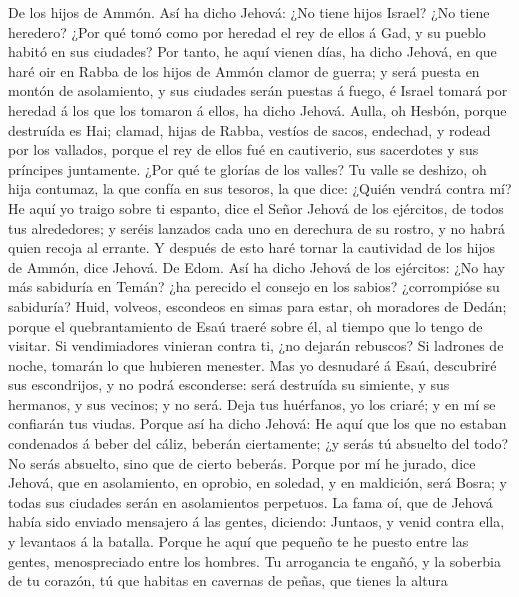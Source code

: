  De los hijos de Ammón. Así ha dicho Jehová: ¿No tiene hijos
Israel? ¿No tiene heredero? ¿Por qué tomó como por heredad el rey de
ellos á Gad, y su pueblo habitó en sus ciudades?  Por tanto,
he aquí vienen días, ha dicho Jehová, en que haré oir en Rabba de los
hijos de Ammón clamor de guerra; y será puesta en montón de asolamiento,
y sus ciudades serán puestas á fuego, é Israel tomará por heredad á los
que los tomaron á ellos, ha dicho Jehová.  Aulla, oh Hesbón,
porque destruída es Hai; clamad, hijas de Rabba, vestíos de sacos,
endechad, y rodead por los vallados, porque el rey de ellos fué en
cautiverio, sus sacerdotes y sus príncipes juntamente.  ¿Por
qué te glorías de los valles? Tu valle se deshizo, oh hija contumaz, la
que confía en sus tesoros, la que dice: ¿Quién vendrá contra mí?
 He aquí yo traigo sobre ti espanto, dice el Señor Jehová de
los ejércitos, de todos tus alrededores; y seréis lanzados cada uno en
derechura de su rostro, y no habrá quien recoja al errante. 
Y después de esto haré tornar la cautividad de los hijos de Ammón, dice
Jehová.  De Edom. Así ha dicho Jehová de los ejércitos: ¿No
hay más sabiduría en Temán? ¿ha perecido el consejo en los sabios?
¿corrompióse su sabiduría?  Huid, volveos, escondeos en
simas para estar, oh moradores de Dedán; porque el quebrantamiento de
Esaú traeré sobre él, al tiempo que lo tengo de visitar.  Si
vendimiadores vinieran contra ti, ¿no dejarán rebuscos? Si ladrones de
noche, tomarán lo que hubieren menester.  Mas yo desnudaré
á Esaú, descubriré sus escondrijos, y no podrá esconderse: será
destruída su simiente, y sus hermanos, y sus vecinos; y no será.
 Deja tus huérfanos, yo los criaré; y en mí se confiarán
tus viudas.  Porque así ha dicho Jehová: He aquí que los
que no estaban condenados á beber del cáliz, beberán ciertamente; ¿y
serás tú absuelto del todo? No serás absuelto, sino que de cierto
beberás.  Porque por mí he jurado, dice Jehová, que en
asolamiento, en oprobio, en soledad, y en maldición, será Bosra; y todas
sus ciudades serán en asolamientos perpetuos.  La fama oí,
que de Jehová había sido enviado mensajero á las gentes, diciendo:
Juntaos, y venid contra ella, y levantaos á la batalla. 
Porque he aquí que pequeño te he puesto entre las gentes, menospreciado
entre los hombres.  Tu arrogancia te engañó, y la soberbia
de tu corazón, tú que habitas en cavernas de peñas, que tienes la altura

